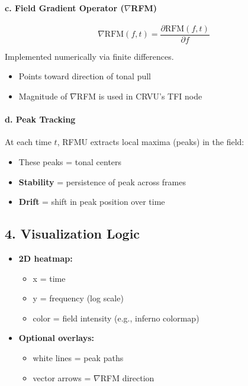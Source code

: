 \paragraph{c. Field Gradient Operator ($\nabla$RFM)}

\[
\nabla \text{RFM}(f, t) = \frac{\partial \text{RFM}(f, t)}{\partial f}
\]

Implemented numerically via finite differences.

\begin{itemize}
    \item Points toward direction of tonal pull
    \item Magnitude of $\nabla$RFM is used in CRVU’s TFI node
\end{itemize}

\paragraph{d. Peak Tracking}

At each time $t$, RFMU extracts local maxima (peaks) in the field:

\begin{itemize}
    \item These peaks = tonal centers
    \item \textbf{Stability} = persistence of peak across frames
    \item \textbf{Drift} = shift in peak position over time
\end{itemize}

\subsection*{4. Visualization Logic}

\begin{itemize}
    \item \textbf{2D heatmap:}
    \begin{itemize}
        \item x = time
        \item y = frequency (log scale)
        \item color = field intensity (e.g., inferno colormap)
    \end{itemize}
    \item \textbf{Optional overlays:}
    \begin{itemize}
        \item white lines = peak paths
        \item vector arrows = $\nabla$RFM direction
    \end{itemize}
\end{itemize}

